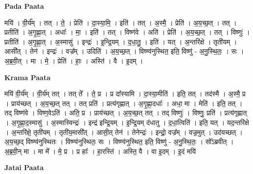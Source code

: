 \documentclass[17pt]{extarticle}
\begin{document}
\textbf{Pada Paata} \newline

मयि॑ । वी॒र्य᳚म् । तत् । ते॒ । प्रेति॑ । दा॒स्या॒मि॒ । इति॑ ।   तत् । अ॒स्मै॒ । प्रेति॑ । अ॒य॒च्छ॒त् । तत् । प्रतीति॑ । अ॒गृ॒ह्णा॒त् । अधाः᳚ । मा॒ । इति॑ । तत् । विष्ण॑वे । अति॑ । प्रेति॑ । अ॒य॒च्छ॒त् । तत् । विष्णुः॑ । प्रतीति॑ । अ॒गृ॒ह्णा॒त् । अ॒स्मासु॑ । इन्द्रः॑ । इ॒न्द्रि॒यम् । द॒धा॒तु॒ । इति॑ । यत् । अ॒न्तरि॑क्षे । तृती॑यम् । आसी᳚त् । तेन॑ । इन्द्रः॑ । वज्र᳚म् । उदिति॑ । अ॒य॒च्छ॒त् । विष्ण्व॑नुस्थित॒ इति॒ विष्णु॑ - अ॒नु॒स्थि॒तः॒ । सः । अ॒ब्र॒वी॒त् । मा । मे॒ । प्रेति॑ । हाः॒ । अस्ति॑ । वै । इ॒दम् ।  \newline


\textbf{Krama Paata} \newline

मयि॑ वी॒र्य᳚म् । वी॒र्य॑म् तत् । तत् ते᳚ । ते॒ प्र । प्र दा᳚स्यामि । दा॒स्या॒मीति॑ । इति॒ तत् । तद॑स्मै । अ॒स्मै॒ प्र । प्राय॑च्छत् । अ॒य॒च्छ॒त् तत् । तत् प्रति॑ । प्रत्य॑गृह्णात् । अ॒गृ॒ह्णा॒दधाः᳚ । अधा॒ मा । मेति॑ । इति॒ तत् । तद् विष्ण॑वे । विष्ण॒वेऽति॑ । अति॒ प्र । प्राय॑च्छत् । अ॒य॒च्छ॒त् तत् । तद् विष्णुः॑ । विष्णुः॒ प्रति॑ । प्रत्य॑गृह्णात् । अ॒गृ॒ह्णा॒द॒स्मासु॑ । अ॒स्मास्विन्द्रः॑ । इन्द्र॑ इन्द्रि॒यम् । इ॒न्द्रि॒यम् द॑धातु । द॒धा॒त्विति॑ । इति॒ यत् । यद॒न्तरि॑क्षे । अ॒न्तरि॑क्षे॒ तृती॑यम् । तृती॑य॒मासी᳚त् । आसी॒त् तेन॑ । तेनेन्द्रः॑ । इन्द्रो॒ वज्र᳚म् । वज्र॒मुत् । उद॑यच्छत् । अ॒य॒च्छ॒द् विष्ण्व॑नुस्थितः । विष्ण्व॑नुस्थितः॒ सः । विष्ण्व॑नुस्थित॒ इति॒ विष्णु॑ - अ॒नु॒स्थि॒तः॒ । सो᳚ऽब्रवीत् । अ॒ब्र॒वी॒न् मा । मा मे᳚ । मे॒ प्र । प्र हाः᳚ । हा॒रस्ति॑ । अस्ति॒ वै । वा इ॒दम् । इ॒दं मयि॑ \newline

\textbf{Jatai Paata} \newline
\end{document}
